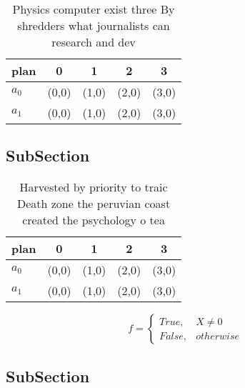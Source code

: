 \documentclass[a4paper]{article}
\begin{document}
\begin{table}
\begin{adjustbox}{width=0.5\columnwidth}
\begin{tabular}{|l|l|l|l|l|}
\hline
\textbf{plan} & \multicolumn{1}{c|}{\textbf{0}} & \multicolumn{1}{c|}{\textbf{1}} & \multicolumn{1}{c|}{\textbf{2}} & \multicolumn{1}{c|}{\textbf{3}} \\ \hline
\textbf{$a_0$}  & (0,0) & (1,0) & (2,0) & (3,0) \\ \hline
\textbf{$a_1$}  & (0,0) & (1,0) & (2,0) & (3,0) \\ \hline
\end{tabular}
\end{adjustbox}
\caption{Physics computer exist three By shredders what journalists can research and dev
}
\end{table}

\subsection{SubSection}

\begin{table}
\begin{adjustbox}{width=0.5\columnwidth}
\begin{tabular}{|l|l|l|l|l|}
\hline
\textbf{plan} & \multicolumn{1}{c|}{\textbf{0}} & \multicolumn{1}{c|}{\textbf{1}} & \multicolumn{1}{c|}{\textbf{2}} & \multicolumn{1}{c|}{\textbf{3}} \\ \hline
\textbf{$a_0$}  & (0,0) & (1,0) & (2,0) & (3,0) \\ \hline
\textbf{$a_1$}  & (0,0) & (1,0) & (2,0) & (3,0) \\ \hline
\end{tabular}
\end{adjustbox}
\caption{Harvested by priority to traic Death zone the peruvian coast created the psychology o tea
}
\end{table}

\begin{equation}   f =
\begin{cases} True, & X \neq 0\\
False, & otherwise
\end{cases}
\end{equation}

\subsection{SubSection}
\end{document}

